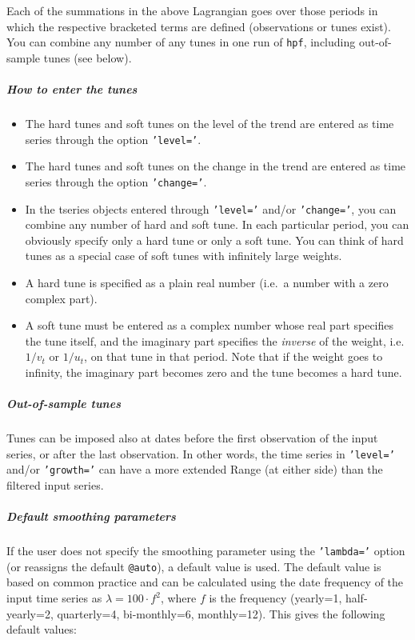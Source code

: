  Each of the summations in the above Lagrangian goes over those periods
 in which the respective bracketed terms are defined (observations or
 tunes exist). You can combine any number of any tunes in one run of
 \texttt{hpf}, including out-of-sample tunes (see below).
 
 \subparagraph{How to enter the tunes}
 
 \begin{itemize}
 \item
   The hard tunes and soft tunes on the level of the trend are entered as
   time series through the option \texttt{'level='}.
 \item
   The hard tunes and soft tunes on the change in the trend are entered
   as time series through the option \texttt{'change='}.
 \item
   In the tseries objects entered through \texttt{'level='} and/or
   \texttt{'change='}, you can combine any number of hard and soft tune.
   In each particular period, you can obviously specify only a hard tune
   or only a soft tune. You can think of hard tunes as a special case of
   soft tunes with infinitely large weights.
 \item
   A hard tune is specified as a plain real number (i.e.~a number with a
   zero complex part).
 \item
   A soft tune must be entered as a complex number whose real part
   specifies the tune itself, and the imaginary part specifies the
   \emph{inverse} of the weight, i.e. $1/v_t$ or $1/u_t$, on that tune in
   that period. Note that if the weight goes to infinity, the imaginary
   part becomes zero and the tune becomes a hard tune.
 \end{itemize}
 
 \subparagraph{Out-of-sample tunes}
 
 Tunes can be imposed also at dates before the first observation of the
 input series, or after the last observation. In other words, the time
 series in \texttt{'level='} and/or \texttt{'growth='} can have a more
 extended Range (at either side) than the filtered input series.
 
 \subparagraph{Default smoothing parameters}
 
 If the user does not specify the smoothing parameter using the
 \texttt{'lambda='} option (or reassigns the default \texttt{@auto}), a
 default value is used. The default value is based on common practice and
 can be calculated using the date frequency of the input time series as
 $\lambda = 100 \cdot f^2$, where $f$ is the frequency (yearly=1,
 half-yearly=2, quarterly=4, bi-monthly=6, monthly=12). This gives the
 following default values:
 
